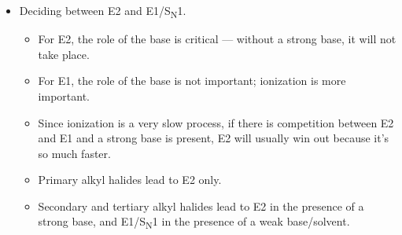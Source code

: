 \documentclass[../notes.tex]{subfiles}
\begin{document}
\begin{itemize}
\begin{itemize}
\begin{itemize}
        \end{itemize}
    \end{itemize}
    \item Deciding between E2 and E1/S\textsubscript{N}1.
    \begin{itemize}
        \item For E2, the role of the base is critical --- without a strong base, it will not take place.
        \item For E1, the role of the base is not important; ionization is more important.
        \item Since ionization is a very slow process, if there is competition between E2 and E1 and a strong base is present, E2 will usually win out because it's so much faster.
        \item Primary alkyl halides lead to E2 only.
        \item Secondary and tertiary alkyl halides lead to E2 in the presence of a strong base, and E1/S\textsubscript{N}1 in the presence of a weak base/solvent.
    \end{itemize}
\end{itemize}
\end{document}

